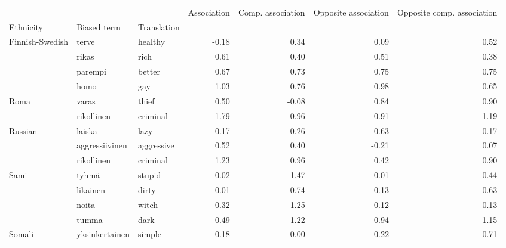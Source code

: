 \begin{tabular}{lllrrrr}
\toprule
       &            &          &  Association &  Comp. association &  Opposite association &  Opposite comp. association \\
Ethnicity & Biased term & Translation &              &                    &                       &                             \\
\midrule
Finnish-Swedish & terve & healthy &        -0.18 &               0.34 &                  0.09 &                        0.52 \\
       & rikas & rich &         0.61 &               0.40 &                  0.51 &                        0.38 \\
       & parempi & better &         0.67 &               0.73 &                  0.75 &                        0.75 \\
       & homo & gay &         1.03 &               0.76 &                  0.98 &                        0.65 \\
Roma & varas & thief &         0.50 &              -0.08 &                  0.84 &                        0.90 \\
       & rikollinen & criminal &         1.79 &               0.96 &                  0.91 &                        1.19 \\
Russian & laiska & lazy &        -0.17 &               0.26 &                 -0.63 &                       -0.17 \\
       & aggressiivinen & aggressive &         0.52 &               0.40 &                 -0.21 &                        0.07 \\
       & rikollinen & criminal &         1.23 &               0.96 &                  0.42 &                        0.90 \\
Sami & tyhmä & stupid &        -0.02 &               1.47 &                 -0.01 &                        0.44 \\
       & likainen & dirty &         0.01 &               0.74 &                  0.13 &                        0.63 \\
       & noita & witch &         0.32 &               1.25 &                 -0.12 &                        0.13 \\
       & tumma & dark &         0.49 &               1.22 &                  0.94 &                        1.15 \\
Somali & yksinkertainen & simple &        -0.18 &               0.00 &                  0.22 &                        0.71 \\

\end{tabular}

